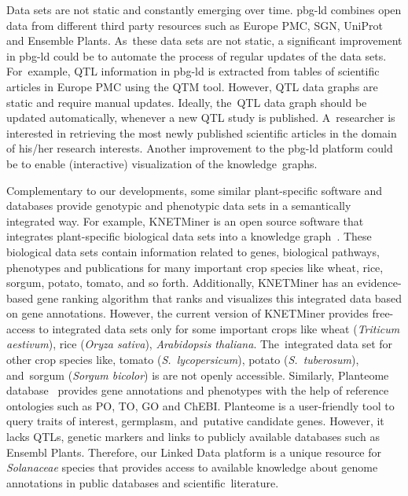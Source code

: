 \documentclass[applsci,article,accept,moreauthors,pdftex]{Definitions/mdpi}
\begin{document}
{Data sets are not static and constantly emerging over time. pbg-ld %
combines open data from different third party resources such as Europe PMC, SGN, UniProt and Ensemble Plants.
As~these data sets are not static, %
a significant improvement in pbg-ld could be to automate the process of regular updates of the data sets.
For~example, QTL information in pbg-ld is extracted from tables of scientific articles in Europe PMC using the QTM tool. %
However, QTL data graphs are static and require manual updates. Ideally, the~QTL data graph should be updated automatically, whenever a new QTL study is published. A~researcher is interested in retrieving the most newly published scientific articles in the domain of his/her research interests. Another improvement to the pbg-ld platform could be to enable (interactive) visualization of the knowledge~graphs.

Complementary %
to our developments, some similar plant-specific software and databases provide genotypic and phenotypic data sets in a semantically integrated way.
For example, %
KNETMiner is an open source software that integrates plant-specific biological data sets into a knowledge graph~\cite{hassani2017knowledge}. These biological data sets contain information related to genes, biological pathways, phenotypes and publications for many important crop species like wheat, rice, sorgum, potato, tomato, and so forth. Additionally, KNETMiner has an evidence-based gene ranking algorithm that ranks and visualizes this integrated data based on gene annotations.
However, the current version of KNETMiner \cite{Knetresources} provides free-access to integrated data sets only for %
some important crops like wheat (\textit{Triticum aestivum}), rice (\textit{Oryza sativa}),
\textit{Arabidopsis thaliana}. %
The~integrated data set for other crop species like, tomato (\textit{S.~lycopersicum}), potato (\textit{S.~tuberosum}), and~sorgum (\textit{Sorgum bicolor}) is are not openly accessible.
Similarly, Planteome database~\cite{Cooper2018} provides gene annotations and phenotypes with the help of reference ontologies such as PO, TO, GO and ChEBI. Planteome is a user-friendly tool to query traits of interest, germplasm, and~putative candidate genes. However, it lacks QTLs, genetic markers and links to publicly available databases such as Ensembl Plants.
Therefore, our Linked Data %
platform is a unique resource for \textit{Solanaceae} %
species that provides access to available knowledge about genome annotations in public databases and scientific~literature.

}
\end{document}
